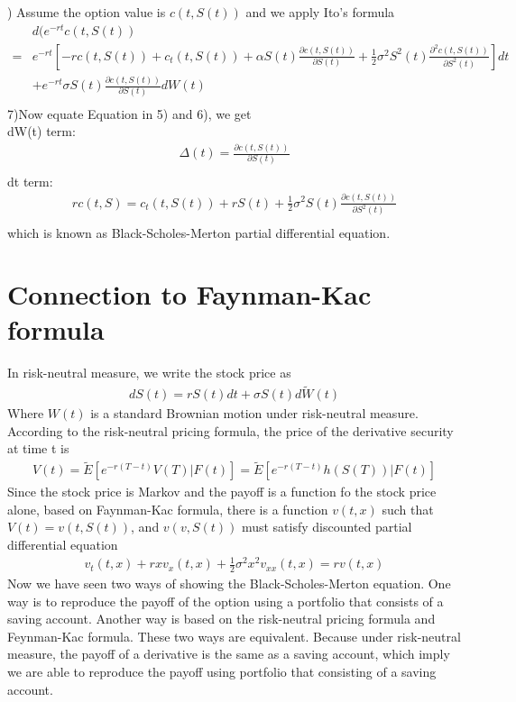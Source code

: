 \documentclass[a4paper]{article}
\begin{document}
) Assume the option value is $c(t,S(t))$ and we apply Ito's formula\\
\begin{align*}
	& d(e^{-rt } c(t, S(t)) \\
= & e^{-rt} [- r c(t, S(t)) + c_t(t, S(t)) + \alpha S(t) \frac{\partial c(t, S(t))}{\partial S(t)}  +\frac{1}{2} \sigma^2 S^2(t) \frac{\partial^2 c(t, S(t))}{\partial S^2(t)} ] dt\\
  & +e^{-rt} \sigma S(t)  \frac{\partial c(t, S(t))}{\partial S(t)} dW(t)\\
\end{align*}
7)\noindent	Now equate Equation in 5) and 6), we get\\
dW(t) term:
\begin{align*}
	\Delta(t) = \frac{\partial c(t,S(t))}{\partial S(t)} \\	
\end{align*}
dt term:
\begin{align*}
	rc(t, S)  = c_t (t, S(t)) + r S(t) + \frac{1}{2} \sigma^2 S(t) \frac{\partial c(t, S(t))}{\partial S^2(t)}  \\
\end{align*}
which is known as Black-Scholes-Merton partial differential equation.
\section{Connection to Faynman-Kac formula}
In risk-neutral measure, we write the stock price as
\begin{align*}
	dS(t) = rS(t) dt + \sigma S(t) d \tilde W(t) 
\end{align*}
Where $W(t)$ is a standard Brownian motion under risk-neutral measure.\\
According to the risk-neutral pricing formula, the price of the derivative security at time t is
\begin{align*}
	V(t) = \tilde E[e^{-r(T-t)}V(T)| F(t)] = \tilde E[e^{-r(T-t)}h(S(T))| F(t)]
\end{align*}
Since the stock price is Markov and the payoff is a function fo the stock price alone, based on Faynman-Kac formula, there is a function $v(t,x)$ such that $V(t) = v(t, S(t))$, and $v(v, S(t))$ must satisfy discounted partial differential equation 
\begin{align*}
	v_t(t,x) + rx v_x(t,x) + \frac{1}{2} \sigma^2 x^2 v_{xx}(t,x) = rv(t,x)
\end{align*}
Now we have seen two ways of showing the Black-Scholes-Merton equation. One way is to reproduce the payoff of the option using a portfolio that consists of a saving account. Another way is based on the risk-neutral pricing formula and Feynman-Kac formula. These two ways are equivalent. Because under risk-neutral measure, the payoff of a derivative is the same as a saving account, which imply we are able to reproduce the payoff using portfolio that consisting of a saving account.
\end{document}
